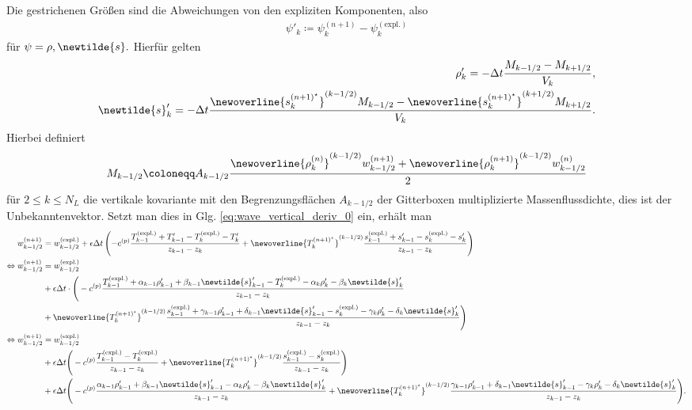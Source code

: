 %
Die gestrichenen Größen sind die Abweichungen von den expliziten Komponenten, also
%
\begin{align}
\psi'_k \coloneqq \psi_k^{(n + 1)} - \psi_k^{(\text{expl.})}
\end{align}
%
für $\psi = \rho, \newtilde{s}.$ Hierfür gelten
%
\begin{align}
\rho_k' = -\Delta t\frac{M_{k - 1/2} - M_{k + 1/2}}{V_k},\\
\newtilde{s}_k' = -\Delta t\frac{\newoverline{s_k^{(n + 1)^\star}}^{(k - 1/2)}M_{k - 1/2} - \newoverline{s_k^{(n + 1)^\star}}^{(k + 1/2)}M_{k + 1/2}}{V_k}.
\end{align}
%
Hierbei definiert
%
\begin{align}
M_{k - 1/2} \coloneqq A_{k - 1/2}\frac{\newoverline{\rho_k^{(n)}}^{(k - 1/2)}w_{k - 1/2}^{(n + 1)} + \newoverline{\rho_k^{(n + 1)}}^{(k - 1/2)}w_{k - 1/2}^{(n)}}{2}\label{eq:def_ml}
\end{align}
%
für $2 \leq k \leq N_L$ die vertikale kovariante mit den Begrenzungsflächen $A_{k - 1/2}$ der Gitterboxen multiplizierte Massenflussdichte, dies ist der Unbekanntenvektor. Setzt man dies in Glg. \eqref{eq:wave_vertical_deriv_0} ein, erhält man
%
\begin{align}
w_{k - 1/2}^{(n + 1)} &= w_{k - 1/2}^{(\text{expl.})} + \epsilon\Delta t\left(-c^{(p)}\frac{T^{(\text{expl.})}_{k - 1} + T'_{k - 1} - T^{(\text{expl.})}_{k} - T'_k}{z_{k - 1} - z_{k}} + \newoverline{T_k^{(n + 1)^\star}}^{(k - 1/2)}\frac{s^{(\text{expl.})}_{k - 1} + s'_{k - 1} - s^{(\text{expl.})}_k - s'_k}{z_{k - 1} - z_k}\right)\nonumber\\
\Leftrightarrow w_{k - 1/2}^{(n + 1)} &= w_{k - 1/2}^{(\text{expl.})}\nonumber\\
&+ \epsilon\Delta t\cdot\Bigg(-c^{(p)}\frac{T^{(\text{expl.})}_{k - 1} + \alpha_{k - 1}\rho'_{k - 1} + \beta_{k - 1}\newtilde{s}'_{k - 1} - T^{(\text{expl.})}_{k} - \alpha_k\rho'_k - \beta_k\newtilde{s}'_k}{z_{k - 1} - z_{k}}\nonumber\\
&+ \newoverline{T_k^{(n + 1)^\star}}^{(k - 1/2)}\frac{s^{(\text{expl.})}_{k - 1} + \gamma_{k - 1}\rho'_{k - 1} + \delta_{k - 1}\newtilde{s}'_{k - 1} - s^{(\text{expl.})}_k - \gamma_k\rho'_k - \delta_k\newtilde{s}'_k}{z_{k - 1} - z_k}\Bigg)\nonumber\\
\Leftrightarrow w_{k - 1/2}^{(n + 1)} &= w_{k - 1/2}^{(\text{expl.})}\nonumber\\
&+ \epsilon\Delta t\Bigg(-c^{(p)}\frac{T^{(\text{expl.})}_{k - 1} - T^{(\text{expl.})}_{k}}{z_{k - 1} - z_{k}} + \newoverline{T_k^{(n + 1)^\star}}^{(k - 1/2)}\frac{s^{(\text{expl.})}_{k - 1} - s^{(\text{expl.})}_k}{z_{k - 1} - z_k}\Bigg)\nonumber\\
&+ \epsilon\Delta t\Bigg(-c^{(p)}\frac{\alpha_{k - 1}\rho'_{k - 1} + \beta_{k - 1}\newtilde{s}'_{k - 1} - \alpha_k\rho'_k - \beta_k\newtilde{s}'_k}{z_{k - 1} - z_{k}} + \newoverline{T_k^{(n + 1)^\star}}^{(k - 1/2)}\frac{\gamma_{k - 1}\rho'_{k - 1} + \delta_{k - 1}\newtilde{s}'_{k - 1} - \gamma_k\rho'_k - \delta_k\newtilde{s}'_k}{z_{k - 1} - z_k}\Bigg).
\end{align}
